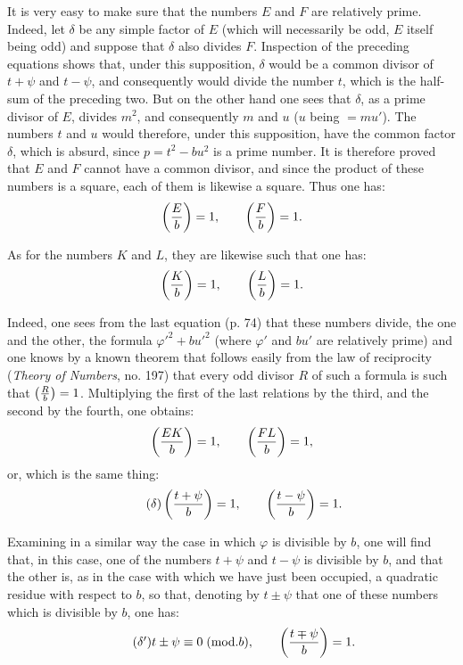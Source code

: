 \par\noindent
It is very easy to make sure that the numbers $E$ and $F$ are relatively prime. Indeed, let
$\delta$ be any simple factor of $E$ (which will necessarily be odd, $E$ itself being odd) and
suppose that $\delta$ also divides $F$. Inspection of the preceding equations shows that, under
this supposition, $\delta$ would be a common divisor of $t+\psi$ and $t-\psi$, and consequently
would divide the number $t$, which is the half-sum of the preceding two. But on the other hand one
sees that $\delta$, as a prime divisor of $E$, divides $m^2$, and consequently $m$ and $u$ ($u$
being $=mu'$). The numbers $t$ and $u$ would therefore, under this supposition, have the common
factor $\delta$, which is absurd, since $p=t^2-bu^2$ is a prime number. It is therefore proved
that $E$ and $F$ cannot have a common divisor, and since the product of these numbers is a square,
each of them is likewise a square. Thus one has:
\[
\left(\frac{E}{b}\right)=1,\qquad \left(\frac{F}{b}\right)=1.
\]
\par\noindent
As for the numbers $K$ and $L$, they are likewise such that one has:
\[
\left(\frac{K}{b}\right)=1,\qquad \left(\frac{L}{b}\right)=1.
\]
\par\noindent
Indeed, one sees from the last equation (p. 74) that these numbers divide, the one and the other,
the formula $\varphi'^2+bu'^2$ (where $\varphi'$ and $bu'$ are relatively prime) and one knows by
a known theorem that follows easily from the law of reciprocity (\emph{Theory of Numbers}, no.
197) that every odd divisor $R$ of such a formula is such that $\left(\frac{R}{b}\right)=1$. Multiplying the
first of the last relations by the third, and the second by the fourth, one obtains:
\[
\left(\frac{EK}{b}\right)=1,\qquad \left(\frac{FL}{b}\right)=1,
\]
or, which is the same thing:
\begin{equation*}\tag{$\delta$}
\left(\frac{t+\psi}{b}\right)=1,\qquad \left(\frac{t-\psi}{b}\right)=1.
\end{equation*}
\par\noindent
Examining in a similar way the case in which $\varphi$ is divisible by $b$, one will find that, in
this case, one of the numbers $t+\psi$ and $t-\psi$ is divisible by $b$, and that the other is, as
in the case with which we have just been occupied, a quadratic residue with respect to $b$, so
that, denoting by $t\pm\psi$ that one of these numbers which is divisible by $b$, one has:
\begin{equation*}\tag{$\delta'$}
t\pm\psi\equiv0\;(\mathrm{mod}.b),\qquad
\left(\frac{t\mp\psi}{b}\right)=1.
\end{equation*}
